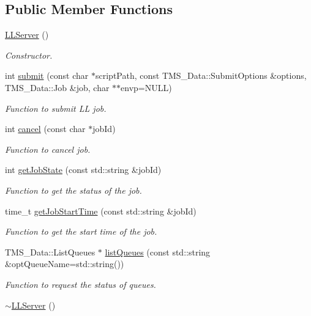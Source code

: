 \subsection*{Public Member Functions}
\begin{DoxyCompactItemize}
\item 
\hypertarget{classLLServer_a4e8e2d9350b695e53dfbfe41a673ab61}{
\hyperlink{classLLServer_a4e8e2d9350b695e53dfbfe41a673ab61}{LLServer} ()}
\label{classLLServer_a4e8e2d9350b695e53dfbfe41a673ab61}

\begin{DoxyCompactList}\small\item\em Constructor. \item\end{DoxyCompactList}\item 
int \hyperlink{classLLServer_a69115c3fd71ea7449003156d50508b37}{submit} (const char $\ast$scriptPath, const TMS\_\-Data::SubmitOptions \&options, TMS\_\-Data::Job \&job, char $\ast$$\ast$envp=NULL)
\begin{DoxyCompactList}\small\item\em Function to submit LL job. \item\end{DoxyCompactList}\item 
int \hyperlink{classLLServer_ac547f34f2fcdfb1a8950de77fd8377e1}{cancel} (const char $\ast$jobId)
\begin{DoxyCompactList}\small\item\em Function to cancel job. \item\end{DoxyCompactList}\item 
int \hyperlink{classLLServer_a9a47c22111b809031c69879f10ce4b03}{getJobState} (const std::string \&jobId)
\begin{DoxyCompactList}\small\item\em Function to get the status of the job. \item\end{DoxyCompactList}\item 
time\_\-t \hyperlink{classLLServer_a9ee6e489594d927c1c4c24fb03a16492}{getJobStartTime} (const std::string \&jobId)
\begin{DoxyCompactList}\small\item\em Function to get the start time of the job. \item\end{DoxyCompactList}\item 
TMS\_\-Data::ListQueues $\ast$ \hyperlink{classLLServer_ae804a87a0a62253ec3b90eb8d409ffd1}{listQueues} (const std::string \&optQueueName=std::string())
\begin{DoxyCompactList}\small\item\em Function to request the status of queues. \item\end{DoxyCompactList}\item 
\hypertarget{classLLServer_a6ce6925164e8a184e1b3883e8e8a07c6}{
\hyperlink{classLLServer_a6ce6925164e8a184e1b3883e8e8a07c6}{$\sim$LLServer} ()}
\label{classLLServer_a6ce6925164e8a184e1b3883e8e8a07c6}


\end{DoxyCompactItemize}
